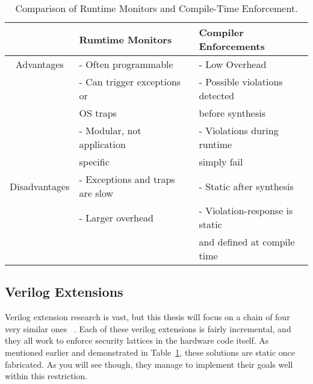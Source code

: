 \documentclass[sigconf,usenames,dvipsnames,svgnames,table]{acmart}
\begin{document}
    \begin{table}
      \centering
      \begin{tabular}{|c|l|l|} 
        \hline
          & Rumtime Monitors & Compiler Enforcements\\
        \hline
          Advantages
          & - Often programmable 
            & - Low Overhead \\
          & - Can trigger exceptions or
            & - Possible violations detected \\
          &\quad OS traps &\quad before synthesis \\ 
          & - Modular, not application  
            & - Violations during runtime \\
          &\quad specific &\quad simply fail \\
          \hline
          Disadvantages
          & - Exceptions and traps are slow 
            & - Static after synthesis \\
          & - Larger overhead 
            & - Violation-response is static \\
          & &\quad and defined at compile time \\
        \hline
      \end{tabular}
      \caption{Comparison of Runtime Monitors and Compile-Time Enforcement.}
      \label{table:prior:run-vs-comp}
    \end{table}

    \subsection{Verilog Extensions}\label{sec:prior:csbl}
      Verilog extension research is vast, but this thesis will focus on a chain of four very similar ones ~\cite{2011caisson, 2014sapper, 2015secverilog, 2017secverilogbl}.
      Each of these verilog extensions is fairly incremental, and they all work to enforce security lattices in the hardware code itself.
      As mentioned earlier and demonstrated in Table~\ref{table:prior:run-vs-comp}, these solutions are static once fabricated.
      As you will see though, they manage to implement their goals well within this restriction.
\end{document}

